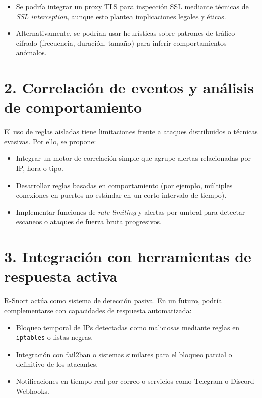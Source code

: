 \documentclass[11pt,a4paper,twoside]{report}
\begin{document}
\begin{itemize}
	\item Se podría integrar un proxy TLS para inspección SSL mediante técnicas de \textit{SSL interception}, aunque esto plantea implicaciones legales y éticas.
	\item Alternativamente, se podrían usar heurísticas sobre patrones de tráfico cifrado (frecuencia, duración, tamaño) para inferir comportamientos anómalos.
\end{itemize}

\section*{2. Correlación de eventos y análisis de comportamiento}

El uso de reglas aisladas tiene limitaciones frente a ataques distribuidos o técnicas evasivas. Por ello, se propone:

\begin{itemize}
	\item Integrar un motor de correlación simple que agrupe alertas relacionadas por IP, hora o tipo.
	\item Desarrollar reglas basadas en comportamiento (por ejemplo, múltiples conexiones en puertos no estándar en un corto intervalo de tiempo).
	\item Implementar funciones de \textit{rate limiting} y alertas por umbral para detectar escaneos o ataques de fuerza bruta progresivos.
\end{itemize}

\section*{3. Integración con herramientas de respuesta activa}

R-Snort actúa como sistema de detección pasiva. En un futuro, podría complementarse con capacidades de respuesta automatizada:

\begin{itemize}
	\item Bloqueo temporal de IPs detectadas como maliciosas mediante reglas en \texttt{iptables} o listas negras.
	\item Integración con fail2ban o sistemas similares para el bloqueo parcial o definitivo de los atacantes.
	\item Notificaciones en tiempo real por correo o servicios como Telegram o Discord Webhooks.
\end{itemize}
\end{document}
